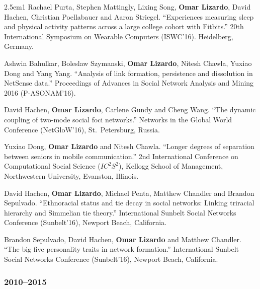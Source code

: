 \documentclass[
]{article}
\newenvironment{cventry}{\begin{hangparas}{2.5em}{1}}{\end{hangparas}}
\begin{document}
\begin{cventry}
Rachael Purta, Stephen Mattingly, Lixing Song, \textbf{Omar Lizardo},
David Hachen, Christian Poellabauer and Aaron Striegel. ``Experiences
measuring sleep and physical activity patterns across a large college
cohort with Fitbits.'' 20th International Symposium on Wearable
Computers (ISWC'16). Heidelberg, Germany.

Ashwin Bahulkar, Boleslaw Szymanski, \textbf{Omar Lizardo}, Nitesh
Chawla, Yuxiao Dong and Yang Yang. ``Analysis of link formation,
persistence and dissolution in NetSense data.'' Proceedings of Advances
in Social Network Analysis and Mining 2016 (P-ASONAM'16).

David Hachen, \textbf{Omar Lizardo}, Carlene Gundy and Cheng Wang. ``The
dynamic coupling of two-mode social foci networks.'' Networks in the
Global World Conference (NetGloW'16), St.~Petersburg, Russia.

Yuxiao Dong, \textbf{Omar Lizardo} and Nitesh Chawla. ``Longer degrees
of separation between seniors in mobile communication.'' 2nd
International Conference on Computational Social Science (\(IC^2S^2\)),
Kellogg School of Management, Northwestern University, Evanston,
Illinois.

David Hachen, \textbf{Omar Lizardo}, Michael Penta, Matthew Chandler and
Brandon Sepulvado. ``Ethnoracial status and tie decay in social
networks: Linking triracial hierarchy and Simmelian tie theory.''
International Sunbelt Social Networks Conference (Sunbelt'16), Newport
Beach, California.

Brandon Sepulvado, David Hachen, \textbf{Omar Lizardo} and Matthew
Chandler. ``The big five personality traits in network formation.''
International Sunbelt Social Networks Conference (Sunbelt'16), Newport
Beach, California.

\end{cventry}

\subsubsection{2010--2015}\label{section-28}
\end{document}
